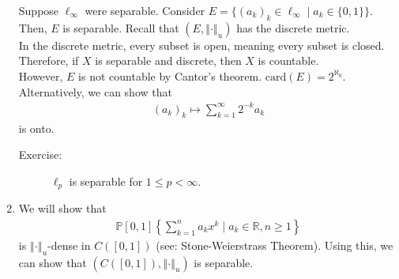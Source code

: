 \documentclass[10pt]{extarticle}
\newcommand{\card}{\text{card}}
\newcommand{\R}{\mathbb{R}}
\newcommand{\norm}[1]{\left\Vert #1 \right\Vert}
\begin{document}
\begin{enumerate}[(1)]
      Suppose $\ell_{\infty}$ were separable. Consider $E = \{(a_k)_k\in \ell_{\infty}\mid a_k \in \{0,1\}\}$. Then, $E$ is separable. Recall that $(E,\norm{\cdot}_u)$ has the discrete metric.\\

      In the discrete metric, every subset is open, meaning every subset is closed. Therefore, if $X$ is separable and discrete, then $X$ is countable.\\

      However, $E$ is not countable by Cantor's theorem. $\card(E) = 2^{\aleph_0}$.\\

      Alternatively, we can show that
      \begin{align*}
        (a_k)_k \mapsto \sum_{k=1}^{\infty}2^{-k}a_k
      \end{align*}
      is onto.
      \begin{description}
        \item[Exercise:] $\ell_p$ is separable for $1 \leq p < \infty$.
      \end{description}
    \item We will show that 
      \begin{align*}
        \mathbb{P}[0,1]\left\{\sum_{k=1}^{n}a_kx^k\mid a_k\in \R,n\geq 1\right\}
      \end{align*}
      is $\norm{\cdot}_u$-dense in $C([0,1])$ (see: Stone-Weierstrass Theorem). Using this, we can show that $(C([0,1]),\norm{\cdot}_u)$ is separable.
  \end{enumerate}
\end{document}
